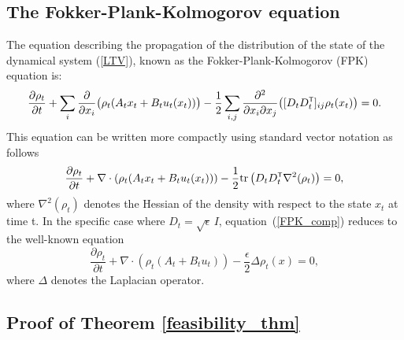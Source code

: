 \documentclass[twoside]{article}
\renewcommand{\eqref}[1]{(\ref{#1})}
\renewcommand{\t}{^{\mbox{\tiny\sf T}}} %
\newcommand{\tr}{\mathrm{tr}}
\newcommand{\hess}{\nabla^2}
\newcommand{\su}{\mathrm{sum}}
\newcommand{\todo}[1]{{\color{magenta}[ToDo: #1]}}
\begin{document}
\subsection{The Fokker-Plank-Kolmogorov equation}

The equation describing the propagation of the distribution of the state of the dynamical system \eqref{LTV}, known as the Fokker-Plank-Kolmogorov (FPK) equation \citep{sarkka2019applied} is:
%
\begin{equation} \label{FPK}
    \frac{\partial \rho_t}{\partial t}  +  \sum_i \frac{\partial}{\partial x_i} 
    \big(  \rho_t (A_t x_t + B_t u_t(x_t)) \big) 
    - \frac{1}{2} \sum_{i,j} \frac{\partial^2}{\partial x_i \partial x_j} \big( [D_t D_t\t]_{ij} \rho_t(x_t)\big) = 0.
\end{equation}
%
This equation can be written more compactly using standard vector notation as follows
\begin{equation} \label{FPK_comp}
    \frac{\partial \rho_t}{\partial t}  +  \nabla \cdot \left( \rho_t (A_t x_t + B_t u_t(x_t)) \right) - \frac{1}{2} \tr \left( D_t D_t\t \hess(\rho_t) \right) = 0, 
\end{equation}
where $\hess(\rho_t)$ denotes the Hessian of the density with respect to the state $x_t$ at time t.
In the specific case where $D_t = \sqrt{\epsilon} \, I$, equation~\eqref{FPK_comp} reduces to the well-known equation
\begin{equation}
        \frac{\partial \rho_t}{\partial t}  + \nabla \cdot \left( \rho_t (A_t + B_t u_t) \right) - \frac{\epsilon}{2} \Delta \rho_t(x) = 0,
\end{equation}
where $\Delta$ denotes the Laplacian operator.

% 
\subsection{Proof of Theorem \ref{feasibility_thm}} 
\end{document}
